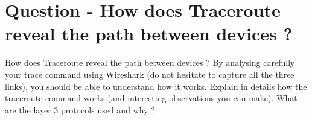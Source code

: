 \section{Question - How does Traceroute reveal the path between devices ?}

\begin{questionBox}{ How does Traceroute reveal the path between devices ?}
    By analysing carefully your trace command using Wireshark (do not hesitate to capture all the three links), you should be able to understand how it works. Explain in details how the traceroute command works (and interesting observations you can make). What are the layer 3 protocols used and why ?
\end{questionBox}
